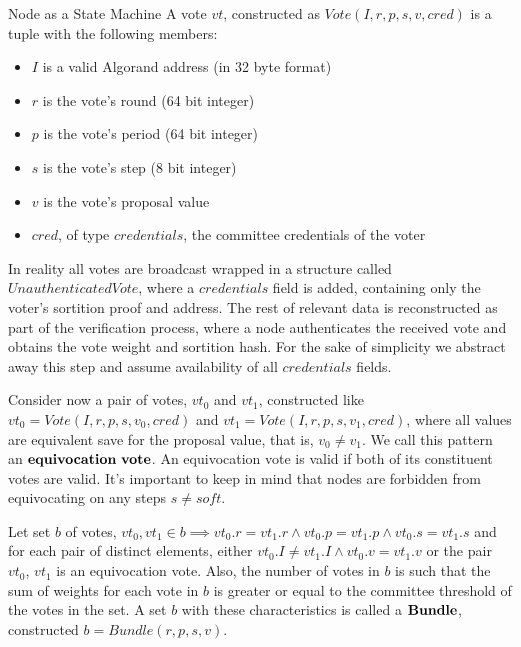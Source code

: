 \documentclass[10pt,a4paper]{article}
\begin{document}
\begin{section}{Node as a State Machine}
A vote $vt$, constructed as $Vote(I,r,p,s,v,cred)$ is a tuple with the following members:
\begin{itemize}
    \item $I$ is a valid Algorand address (in 32 byte format)
    \item $r$ is the vote's round (64 bit integer)
    \item $p$ is the vote's period (64 bit integer)
    \item $s$ is the vote's step (8 bit integer)
    \item $v$ is the vote's proposal value
    \item $cred$, of type $credentials$, the committee credentials of the voter
\end{itemize}

In reality all votes are broadcast wrapped in a structure called $UnauthenticatedVote$, where
a $credentials$ field is added, containing only the voter's sortition proof and address.
The rest of relevant data is reconstructed as part of the verification process, 
where a node authenticates the received vote and obtains the vote weight and sortition hash.
For the sake of simplicity we abstract away this step and assume availability of all $credentials$ fields.

Consider now a pair of votes, $vt_0$ and $vt_1$, constructed like
$vt_0 = Vote(I, r, p, s, v_0, cred)$ and $vt_1 = Vote(I, r, p, s, v_1, cred)$, where all values are equivalent
save for the proposal value, that is, $v_0 \neq v_1$. We call this pattern an $\bold{equivocation \ vote}$.
An equivocation vote is valid if both of its constituent votes are valid.
It's important to keep in mind that nodes are forbidden from equivocating on any steps $s \neq soft$.

Let set $b$ of votes, $vt_0, vt_1 \in b \implies vt_0.r = vt_1.r \land vt_0.p = vt_1.p \land vt_0.s = vt_1.s$ and for each pair of distinct elements,
either $vt_0.I \neq vt_1.I \land vt_0.v = vt_1.v$ or the pair $vt_0$, $vt_1$ is an equivocation vote. Also, the number of votes in $b$ is such that
the sum of weights for each vote in $b$ is greater or equal to the committee threshold of the votes in the set.
A set $b$ with these characteristics is called a $\bold{Bundle}$, constructed $b = Bundle(r,p,s,v)$.


\end{section}
\end{document}
